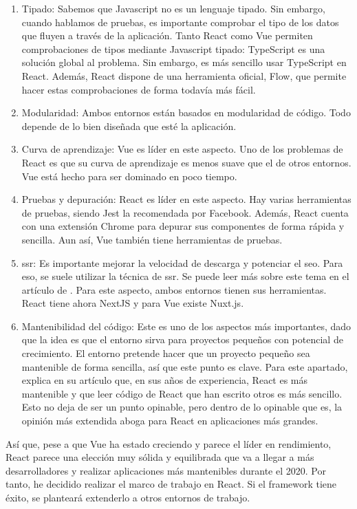 \begin{enumerate}
	\item Tipado: Sabemos que Javascript no es un lenguaje tipado. Sin embargo, cuando hablamos de pruebas, es importante comprobar el tipo de los datos que fluyen a través de la aplicación. Tanto React como Vue permiten comprobaciones de tipos mediante Javascript tipado: TypeScript es una solución global al problema. Sin embargo, es más sencillo usar TypeScript en React. Además, React dispone de una herramienta oficial, Flow, que permite hacer estas comprobaciones de forma todavía más fácil.
	\item Modularidad: Ambos entornos están basados en modularidad de código. Todo depende de lo bien diseñada que esté la aplicación.
	\item Curva de aprendizaje: Vue es líder en este aspecto. Uno de los problemas de React es que su curva de aprendizaje es menos suave que el de otros entornos. Vue está hecho para ser dominado en poco tiempo.
	\item Pruebas y depuración: React es líder en este aspecto. Hay varias herramientas de pruebas, siendo Jest la recomendada por Facebook. Además, React cuenta con una extensión Chrome para depurar sus componentes de forma rápida y sencilla. Aun así, Vue también tiene herramientas de pruebas.
	\item \gls{ssr}: Es importante mejorar la velocidad de descarga y potenciar el \gls{seo}. Para eso, se suele utilizar la técnica de \gls{ssr}. Se puede leer más sobre este tema en el artículo de \citet{SSREXP}. Para este aspecto, ambos entornos tienen sus herramientas. React tiene ahora NextJS y para Vue existe Nuxt.js.
	\item Mantenibilidad del código: Este es uno de los aspectos más importantes, dado que la idea es que el entorno sirva para proyectos pequeños con potencial de crecimiento. El entorno pretende hacer que un proyecto pequeño sea mantenible de forma sencilla, así que este punto es clave. Para este apartado, \citet{RVVMNTB} explica en su artículo que, en sus años de experiencia, React es más mantenible y que leer código de React que han escrito otros es más sencillo. Esto no deja de ser un punto opinable, pero dentro de lo opinable que es, la opinión más extendida aboga para React en aplicaciones más grandes.
\end{enumerate}

Así que, pese a que Vue ha estado creciendo y parece el líder en rendimiento, React parece una elección muy sólida y equilibrada que va a llegar a más desarrolladores y realizar aplicaciones más mantenibles durante el 2020. Por tanto, he decidido realizar el marco de trabajo en React. Si el framework tiene éxito, se planteará extenderlo a otros entornos de trabajo.


